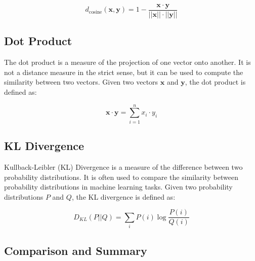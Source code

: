 \documentclass[12pt]{article}
\begin{document}
$$d_{\text{cosine}}(\mathbf{x}, \mathbf{y}) = 1 - \frac{\mathbf{x} \cdot \mathbf{y}}{||\mathbf{x}|| \cdot ||\mathbf{y}||}$$

\subsection{Dot Product}

The dot product is a measure of the projection of one vector onto another. It is not a distance measure in the strict sense, but it can be used to compute the similarity between two vectors. Given two vectors $\mathbf{x}$ and $\mathbf{y}$, the dot product is defined as:

$$\mathbf{x} \cdot \mathbf{y} = \sum_{i=1}^{n} x_i \cdot y_i$$

\subsection{KL Divergence}

Kullback-Leibler (KL) Divergence is a measure of the difference between two probability distributions. It is often used to compare the similarity between probability distributions in machine learning tasks. Given two probability distributions $P$ and $Q$, the KL divergence is defined as:

$$D_{KL}(P || Q) = \sum_{i} P(i) \log \frac{P(i)}{Q(i)}$$

\subsection{Comparison and Summary}
\end{document}
